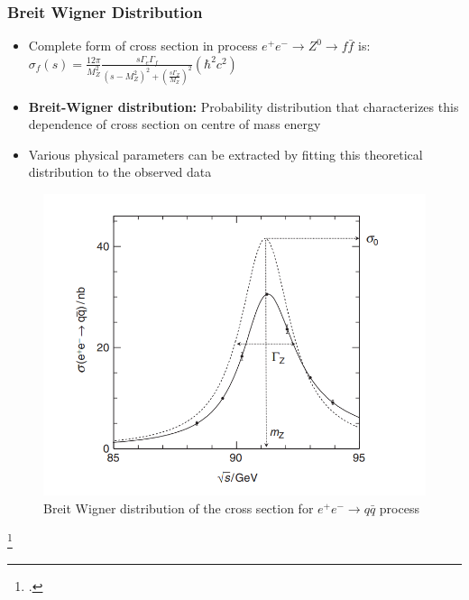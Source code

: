 \documentclass[10pt]{beamer}
\begin{document}
\begin{frame}
\frametitle{Breit Wigner Distribution}
\begin{minipage}{0.5\textwidth}
\begin{itemize}
\item Complete form of cross section in process $e^{+}e^{-}\rightarrow Z^{0}\rightarrow f\bar{f}$ is:
\vspace{0.5em}
$\sigma_f (s) = \frac{12\pi}{M_Z^2} \frac{s \Gamma_e \Gamma_f}{(s-M_Z^2)^2 + \left(\frac{s\Gamma_Z}{M_Z}\right)^2} (\hbar^2 c^2)$
\item \textbf{Breit-Wigner distribution:} Probability distribution that characterizes this dependence of cross section on centre of mass energy 
\item Various physical parameters can be extracted by fitting this theoretical distribution to the observed data
\end{itemize}
\end{minipage}\hspace{0.5em}
\begin{minipage}{0.45\textwidth}
\begin{figure}
\centering
\includegraphics[width=\textwidth]{BWdist}
\caption{Breit Wigner distribution of the cross section for $e^{+}e^{-}\rightarrow q\bar{q}$ process \footnotemark{}}
\end{figure}
\end{minipage}
\footcitetext{thomson_2013}
\end{frame}
\end{document}
